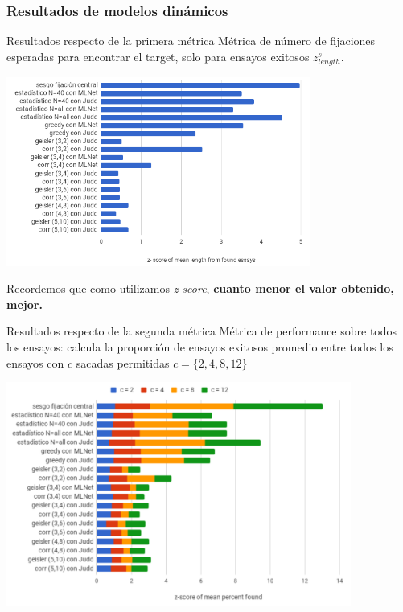 \documentclass[compress]{beamer}
\begin{document}
\subsubsection{Resultados de modelos dinámicos}
\begin{frame}{Resultados respecto de la primera métrica}
{Métrica de número de fijaciones esperadas para
encontrar el target, solo para ensayos exitosos $z_{length}^s$.}

\begin{center}
\includegraphics[width=0.75\textwidth]{images/z-score-mean-length.png}
\end{center}
{\scriptsize Recordemos que como utilizamos \textit{z-score}, \textbf{cuanto menor el valor obtenido, mejor.}}
\end{frame}

\begin{frame}{Resultados respecto de la segunda métrica}
{Métrica de performance sobre todos los ensayos: calcula la proporción de ensayos exitosos promedio entre todos los ensayos con $c$ sacadas permitidas $c = \{2,4,8,12\}$}

\begin{center}
\includegraphics[width=0.85\textwidth]{images/z-score-percent-found.png}
\end{center}

\end{frame}
\end{document}
